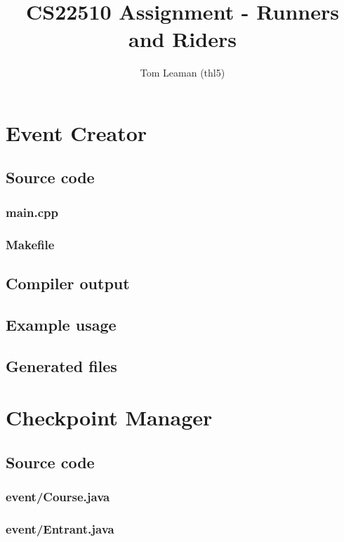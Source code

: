 \documentclass[a4paper, twoside]{article}
\title{CS22510 Assignment - Runners and Riders}
\author{Tom Leaman (thl5)}
\begin{document}
\maketitle
\newpage
\tableofcontents
\newpage

\section{Event Creator}
\subsection{Source code}
\subsubsection{main.cpp}

\subsubsection{Makefile}

\subsection{Compiler output}

\subsection{Example usage}
\subsection{Generated files}

\section{Checkpoint Manager}
\subsection{Source code}
\subsubsection{event/Course.java}

\subsubsection{event/Entrant.java}

\end{document}
